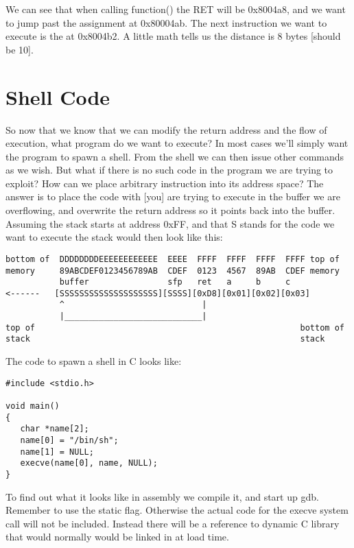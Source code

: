 \documentclass[10pt]{article}
\begin{document}
\begin{CJK}{UTF8}{bsmi}
We can see that when calling function() the RET will be 0x8004a8, and we want to jump past the assignment at 
0x80004ab. The next instruction we want to execute is the at 0x8004b2. A little math tells us the distance is 8 
bytes [should be 10]. 

\section{Shell Code}

So now that we know that we can modify the return address and the flow of execution, what program do we 
want to execute? In most cases we'll simply want the program to spawn a shell. From the shell we can then issue 
other commands as we wish. But what  if there is no such code in the program we are trying to exploit? How can 
we place arbitrary instruction into its address space? The answer is to place the code with [you] are trying to 
execute in the buffer we are overflowing, and overwrite the return address so it points back into the buffer. 
Assuming the stack starts at address 0xFF, and that S stands for the code we want to execute the stack would 
then look like this:

{\scriptsize
\begin{verbatim}
bottom of  DDDDDDDDEEEEEEEEEEEE  EEEE  FFFF  FFFF  FFFF  FFFF top of
memory     89ABCDEF0123456789AB  CDEF  0123  4567  89AB  CDEF memory           
           buffer                sfp   ret   a     b     c
<------   [SSSSSSSSSSSSSSSSSSSS][SSSS][0xD8][0x01][0x02][0x03]
           ^                            |
           |____________________________|
top of                                                      bottom of
stack                                                       stack
\end{verbatim}
}
  

The code to spawn a shell in C looks like:

\begin{lstlisting}[caption=shellcode.c,frame=single,frameround=tttt]
#include <stdio.h>

void main() 
{
   char *name[2];
   name[0] = "/bin/sh";
   name[1] = NULL;
   execve(name[0], name, NULL);
}
\end{lstlisting}

To find out what it looks like in assembly we compile it, and start up gdb. Remember to use the  static flag. 
Otherwise the actual code  for the execve system call will not be included. Instead there will be a reference to 
dynamic C library that would normally would be linked in at load time. 


\end{CJK}
\end{document}
